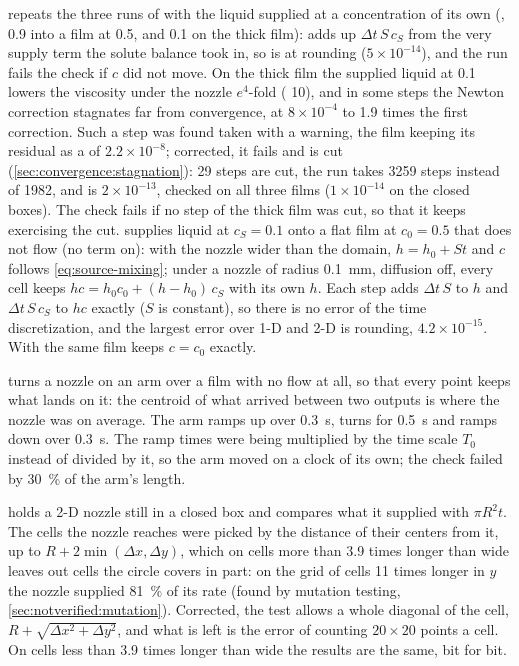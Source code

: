  repeats the three runs of  with
the liquid supplied at a concentration of its own (,  0.9 into a film at 0.5, and 0.1 on the thick film):
 adds up $\Delta t\,S\,c_S$ from the very supply term the
solute balance took in, so  is at rounding
($5\times10^{-14}$), and the run fails the check if $c$ did not move. On the
thick film the supplied liquid at 0.1 lowers the viscosity under the nozzle
$e^{4}$-fold ( 10), and in some steps the Newton correction
stagnates far from convergence, at $8\times10^{-4}$ to 1.9 times the first
correction. Such a step was found taken with a warning, the film keeping its
residual as a  of $2.2\times10^{-8}$; corrected, it fails and is
cut (\cref{sec:convergence:stagnation}): 29 steps are cut, the run takes 3259
steps instead of 1982, and  is $2\times10^{-13}$, checked on all
three films ($1\times10^{-14}$ on the closed boxes). The check fails if no
step of the thick film was cut, so that it keeps exercising the cut. 
supplies liquid at $c_S = 0.1$ onto a flat film at $c_0 = 0.5$ that does not
flow (no term on): with the nozzle wider than the domain, $h = h_0 + St$ and
$c$ follows \cref{eq:source-mixing}; under a nozzle of radius
\SI{0.1}{\milli\metre}, diffusion off, every cell keeps
$hc = h_0c_0 + (h - h_0)\,c_S$ with its own $h$. Each step adds $\Delta t\,S$
to $h$ and $\Delta t\,S\,c_S$ to $hc$ exactly ($S$ is constant), so there is
no error of the time discretization, and the largest error over 1-D and 2-D
is rounding, $4.2\times10^{-15}$. With  the same film keeps
$c = c_0$ exactly.

 turns a nozzle on an arm over a film with no flow at all,
so that every point keeps what lands on it: the centroid of what arrived
between two outputs is where the nozzle was on average. The arm ramps up over
\SI{0.3}{\second}, turns for \SI{0.5}{\second} and ramps down over
\SI{0.3}{\second}. The ramp times were being multiplied by the time scale
$T_0$ instead of divided by it, so the arm moved on a clock of its own; the
check failed by \SI{30}{\percent} of the arm's length.

 holds a 2-D nozzle still in a closed box and compares
what it supplied with  $\pi R^2 t$. The cells the nozzle
reaches were picked by the distance of their centers from it, up to
$R + 2\min(\Delta x, \Delta y)$, which on cells more than 3.9 times longer than
wide leaves out cells the circle covers in part: on the grid of cells 11 times
longer in $y$ the nozzle supplied \SI{81}{\percent} of its rate (found by
mutation testing, \cref{sec:notverified:mutation}). Corrected, the test allows a
whole diagonal of the cell, $R + \sqrt{\Delta x^2 + \Delta y^2}$, and what
is left is the error of counting $20\times20$ points a cell. On cells less
than 3.9 times longer than wide the results are the same, bit for bit.

